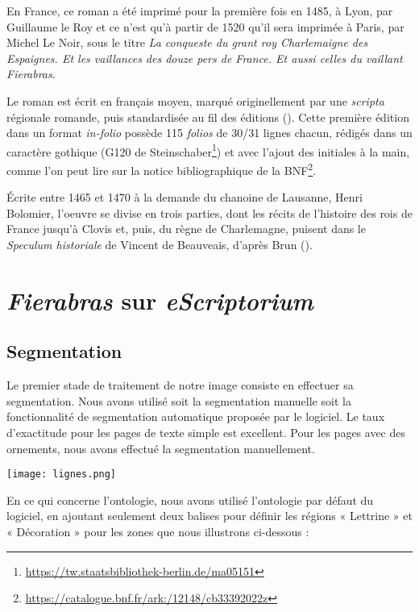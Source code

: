 \documentclass{article}
\begin{document}
     En France, ce roman a été imprimé pour la première fois en 1485, à Lyon, par Guillaume le Roy et ce n’est qu’à partir de 1520 qu’il sera imprimée à Paris, par Michel Le Noir, sous le titre \emph{La conqueste du grant roy Charlemaigne des Espaignes. Et les vaillances des douze pers de France. Et aussi celles du vaillant Fierabras}.
     
    Le roman est écrit en français moyen, marqué originellement par une \emph{scripta} régionale romande, puis standardisée au fil des éditions (\cite{lambert_notice_2017}). Cette première édition dans un format \emph{in-folio} possède 115 \emph{folios} de 30/31 lignes chacun, rédigés dans un caractère gothique (G120 de Steinschaber\footnote{ \url{https://tw.staatsbibliothek-berlin.de/ma05151}}) et avec l’ajout des initiales à la main, comme l’on peut lire sur la notice bibliographique de la BNF\footnote{\url{https://catalogue.bnf.fr/ark:/12148/cb33392022z}}.
    
	Écrite entre 1465 et 1470 à la demande du chanoine de Lausanne, Henri Bolomier, l’oeuvre se divise en trois parties, dont les récits de l'histoire des rois de France jusqu'à Clovis et, puis, du règne de Charlemagne, puisent dans le \emph{Speculum historiale} de Vincent de Beauveais, d'après Brun (\cite{brun_2020}).
\section{\emph{Fierabras} sur \emph{eScriptorium}}
 \subsection{Segmentation}


Le premier stade de traitement de notre image consiste en effectuer sa segmentation.
Nous avons utilisé soit la segmentation manuelle soit la fonctionnalité de segmentation automatique proposée par le logiciel. Le taux d'exactitude pour les pages de texte simple est excellent. Pour les pages avec des ornements, nous avons effectué la segmentation manuellement.

\begin{center}
\texttt{[image: lignes.png]}    
\end{center}


En ce qui concerne l'ontologie, nous avons utilisé l'ontologie par défaut du logiciel, en ajoutant seulement deux balises pour définir les régions « Lettrine »  et « Décoration » pour les zones que nous illustrons ci-dessous :
\end{document}
